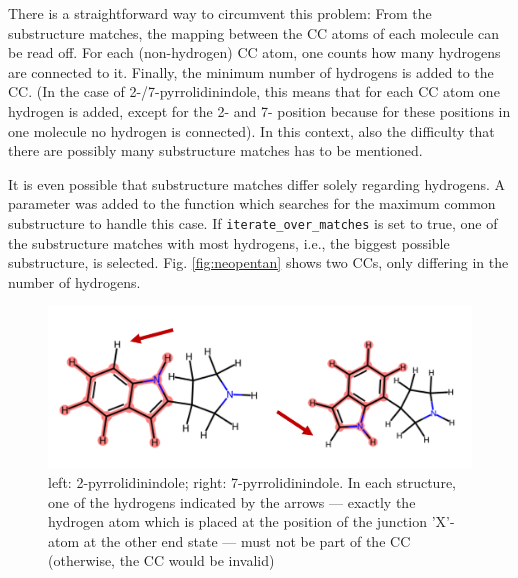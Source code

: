 There is a straightforward way to circumvent this problem: From the substructure matches, the mapping between the CC atoms of each molecule can be read off. For each (non-hydrogen) CC atom, one counts how many hydrogens are connected to it. Finally, the minimum number of hydrogens is added to the CC. (In the case of 2-/7-pyrrolidinindole, this means that for each CC atom one hydrogen is added, except for the 2- and 7- position because for these positions in one molecule no hydrogen is connected).
In this context, also the difficulty that there are possibly many substructure matches has to be mentioned.

It is even possible that substructure matches differ solely regarding hydrogens. A parameter was added to the function which searches for the maximum common substructure to handle this case. If \texttt{iterate\_over\_matches} is set to true, one of the substructure matches with most hydrogens, i.e., the biggest possible substructure, is selected. Fig. \ref{fig:neopentan} shows two CCs, only differing in the number of hydrogens.





\begin{figure}
	\includegraphics[scale=1.0]{pyrrolidinindole_v2}
	
	\caption{
		left: 2-pyrrolidinindole; right: 7-pyrrolidinindole. In each structure, 
		one of the hydrogens indicated by the arrows --- exactly the hydrogen atom which is placed at the position of the junction 'X'-atom at the other end state --- must not be part of the CC (otherwise, the CC would be invalid)}
	\label{fig:pyrrolidinindole}
\end{figure}


